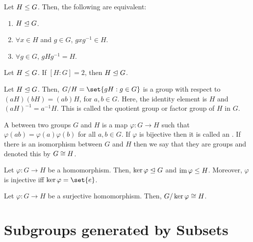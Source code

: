 \documentclass[11pt]{penrose}
\begin{document}
\begin{nthm}
    Let $H \mathrel{\leq} G$. Then, the following are equivalent:
    \begin{enumerate}
        \item $H \mathrel{\trianglelefteq} G$.
        \item $\forall x \in H$ and $g \in G$, $g x g^{-1} \in H$.
        \item $\forall g \in G$, $g H g^{-1} = H$.
    \end{enumerate}
\end{nthm}

\begin{nthm}
    Let $H \mathrel{\leq} G$. If $[H:G] = 2$, then $H \mathrel{\trianglelefteq} G$.
\end{nthm}

\begin{nthm}
    Let $H \mathrel{\trianglelefteq} G$. Then, $G/H = \set{gH : g \in G}$ is a group with respect to $(aH)(bH) = (ab)H$, for $a, b \in G$. Here, the identity element is $H$ and $(aH)^{-1} = a^{-1} H$. This is called the quotient group or factor group of $H$ in $G$.
\end{nthm}

\begin{ndfn}[Homomorphism]
    A  between two groups $G$ and $H$ is a map $\varphi : G \to H$ such that $\varphi(ab) = \varphi(a)\varphi(b)$ for all $a,b \in G$. If $\varphi$ is bijective then it is called an . If there is an isomorphism between $G$ and $H$ then we say that they are  groups and denoted this by $G \mathrel{\cong} H$.
\end{ndfn}

\begin{nthm}
    Let $\varphi : G \to H$ be a homomorphism. Then, $\ker\varphi \mathrel{\trianglelefteq} G$ and $\operatorname{im}\varphi \mathrel{\leq} H$. Moreover, $\varphi$ is injective iff $\ker\varphi = \set{e}$.
\end{nthm}

\begin{nthm}
    Let $\varphi : G \to H$ be a surjective homomorphism. Then, $G / \ker\varphi \mathrel{\cong} H$.
\end{nthm}

\section{Subgroups generated by Subsets}
\end{document}
